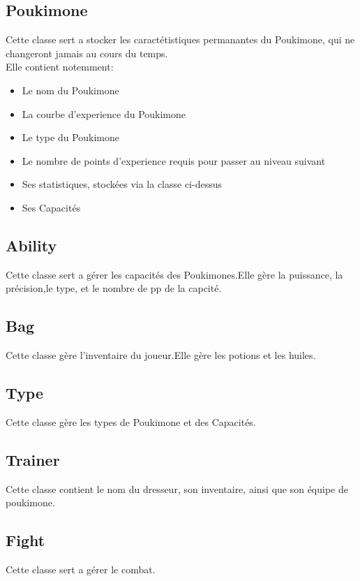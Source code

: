 \documentclass{report}
\begin{document}
\subsection*{Poukimone}
Cette classe sert a stocker les caractétistiques permanantes du Poukimone, qui ne changeront jamais au cours du temps.\\ 
Elle contient notemment:
\begin{itemize}
    \item{Le nom du Poukimone}\\
    \item{La courbe d'experience du Poukimone}\\
    \item{Le type du Poukimone}\\
    \item{Le nombre de points d'experience requis pour passer au niveau suivant}\\
    \item{Ses statistiques, stockées via la classe ci-dessus}\\
    \item{Ses Capacités}
\end{itemize}
\subsection*{Ability}
Cette classe sert a gérer les capacités des Poukimones.Elle gère la puissance, la précision,le type, et le nombre de pp de la capcité.
\subsection*{Bag}
Cette classe gère l'inventaire du joueur.Elle gère les potions et les huiles.
\subsection*{Type}
Cette classe gère les types de Poukimone et des Capacités.
\subsection*{Trainer}
Cette classe contient le nom du dresseur, son inventaire, ainsi que son équipe de poukimone.
\subsection*{Fight}
Cette classe sert a gérer le combat.\\
\end{document}
